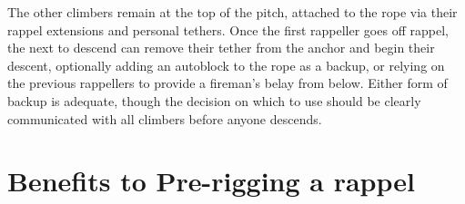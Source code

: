 \documentclass[nonacm,acmtog]{acmart}
\begin{document}
  The other climbers remain at the top of the pitch, attached to the rope via
  their rappel extensions and personal tethers.  Once the first rappeller goes
  off rappel, the next to descend can remove their tether from the anchor and
  begin their descent, optionally adding an autoblock to the rope as a backup,
  or relying on the previous rappellers to provide a fireman's belay from
  below.  Either form of backup is adequate, though the decision on which to
  use should be clearly communicated with all climbers before anyone descends.






\section{Benefits to Pre-rigging a rappel}
\label{sec:benefits}
\end{document}
